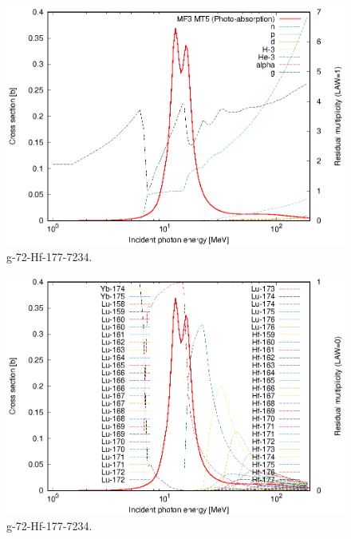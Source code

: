 \begin{figure}
 \includegraphics[width=\linewidth]{eps/g_72-Hf-177_7234.eps}
  \caption{g-72-Hf-177-7234.}
\end{figure}
\begin{figure}
 \includegraphics[width=\linewidth]{eps-law0/g_72-Hf-177_7234.eps}
 \caption{g-72-Hf-177-7234.}
\end{figure}
\newpage \clearpage

